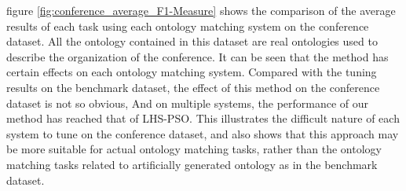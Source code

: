 \documentclass[twoside]{article}
\begin{document}
figure \ref{fig:conference_average_F1-Measure} shows the comparison of the average results of each task using each ontology matching system on the conference dataset.
All the ontology contained in this dataset are real ontologies used to describe the organization of the conference.
It can be seen that the method has certain effects on each ontology matching system.
Compared with the tuning results on the benchmark dataset, the effect of this method on the conference dataset is not so obvious, And on multiple systems, the performance of our method has reached that of LHS-PSO.
This illustrates the difficult nature of each system to tune on the conference dataset, and also shows that this approach may be more suitable for actual ontology matching tasks, rather than the ontology matching tasks related to artificially generated ontology as in the benchmark dataset.
\end{document}

